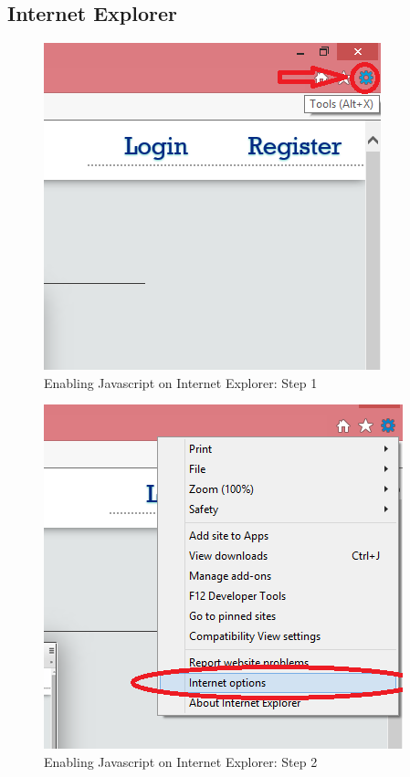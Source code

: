 \subsection{Internet Explorer}

	
		\begin{figure}[!h]
		\centering
			\includegraphics[scale=0.7]{images/javascriptIE1.png}
			\caption{Enabling Javascript on Internet Explorer: Step 1}
		\end{figure}
		
		\begin{figure}[!h]
		\centering
			\includegraphics[scale=0.7]{images/javascriptIE2.png}
			\caption{Enabling Javascript on Internet Explorer: Step 2}
		\end{figure}
		
